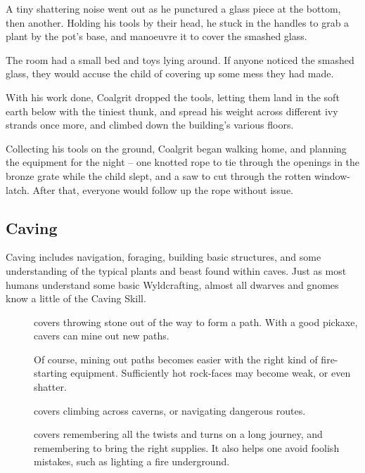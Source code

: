 \begin{multicols}{2}
\begin{exampletext}
  A tiny shattering noise went out as he punctured a glass piece at the bottom, then another.
  Holding his tools by their head, he stuck in the handles to grab a plant by the pot's base, and manoeuvre it to cover the smashed glass.

  The room had a small bed and toys lying around.
  If anyone noticed the smashed glass, they would accuse the child of covering up some mess they had made.

  With his work done, Coalgrit dropped the tools, letting them land in the soft earth below with the tiniest thunk, and spread his weight across different ivy strands once more, and climbed down the building's various floors.

  Collecting his tools on the ground, Coalgrit began walking home, and planning the equipment for the night -- one knotted rope to tie through the openings in the bronze grate while the child slept, and a saw to cut through the rotten window-latch.
  After that, everyone would follow up the rope without issue.
\end{exampletext}

\subsection{Caving}

Caving includes navigation, foraging, building basic structures, and some understanding of the typical plants and beast found within caves.
Just as most humans understand some basic Wyldcrafting, almost all dwarves and gnomes know a little of the Caving Skill.

\begin{description}
  \item[]
    covers throwing stone out of the way to form a path.
    With a good pickaxe, cavers can mine out new paths.

    Of course, mining out paths becomes easier with the right kind of fire-starting equipment.
    Sufficiently hot rock-faces may become weak, or even shatter.
  \item[]
    covers climbing across caverns, or navigating dangerous routes.
  \item[]
    covers remembering all the twists and turns on a long journey, and remembering to bring the right supplies.
    It also helps one avoid foolish mistakes, such as lighting a fire underground.


\end{description}
\end{multicols}
